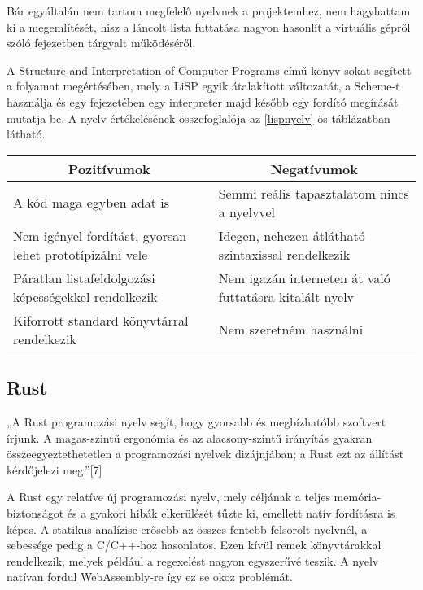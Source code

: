 Bár egyáltalán nem tartom megfelelő nyelvnek a projektemhez, nem hagyhattam ki a megemlítését, hisz a láncolt lista futtatása nagyon hasonlít a virtuális gépről szóló fejezetben tárgyalt működéséről.

A Structure and Interpretation of Computer Programs\cite{sicp} című könyv sokat segített a folyamat megértésében, mely a LiSP egyik átalakított változatát, a Scheme-t használja és egy fejezetében egy interpreter majd később egy fordító megírását mutatja be. A nyelv értékelésének összefoglalója az \ref{lispnyelv}-ös táblázatban látható.

\begin{center}
  \begin{tabularx}{\textwidth}{X X}
    \hline
    \multicolumn{1}{c}{\bfseries{Pozitívumok}}               & \multicolumn{1}{c}{\bfseries{Negatívumok}}              \\
    \hline
    A kód maga egyben adat is                                & Semmi reális tapasztalatom nincs a nyelvvel             \\
    Nem igényel fordítást, gyorsan lehet prototípizálni vele & Idegen, nehezen átlátható szintaxissal rendelkezik      \\
    Páratlan listafeldolgozási képességekkel rendelkezik     & Nem igazán interneten át való futtatásra kitalált nyelv \\
    Kiforrott standard könyvtárral rendelkezik               & Nem szeretném használni                                 \\
    \hline
  \end{tabularx}
\end{center}

\newpage

\subsection{Rust}

„A Rust programozási nyelv segít, hogy gyorsabb és megbízhatóbb szoftvert írjunk. A magas-szintű ergonómia és az alacsony-szintű irányítás gyakran összeegyeztethetetlen a programozási nyelvek dizájnjában; a Rust ezt az állítást kérdőjelezi meg.”[7]

A Rust egy relatíve új programozási nyelv, mely céljának a teljes memória-biztonságot és a gyakori hibák elkerülését tűzte ki, emellett natív fordításra is képes. A statikus analízise erősebb az összes fentebb felsorolt nyelvnél, a sebessége pedig a C/C++-hoz hasonlatos. Ezen kívül remek könyvtárakkal rendelkezik, melyek például a regexelést nagyon egyszerűvé teszik. A nyelv natívan fordul WebAssembly-re így ez se okoz problémát.

